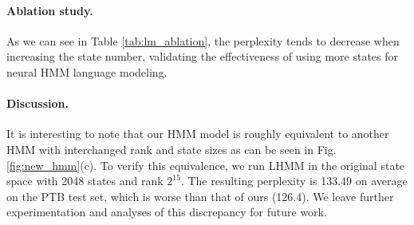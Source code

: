 \documentclass[11pt]{article}
\begin{document}
\paragraph{Ablation study.} 
As we can see in Table \ref{tab:lm_ablation}, the perplexity tends to decrease when increasing the state number, validating the effectiveness of using more states for neural HMM language modeling.

\begin{table}[tb!]
    \centering 
    \caption{Perplexity with varying numbers of states. Following \citet{chiu2021low}, we fix the rank to 2048 for faster ablation studies.}
    \label{tab:lm_ablation}
\end{table}

\paragraph{Discussion.} It is interesting to note that our HMM model is roughly equivalent to another HMM with interchanged rank and state sizes as can be seen in Fig.\ref{fig:new_hmm}(c). To verify this equivalence, we run LHMM in the original state space with 2048 states and rank $2^{15}$. The resulting perplexity is 133.49 on average on the PTB test set, which is worse than that of ours (126.4). 
We leave further experimentation and analyses of this discrepancy for future work.
\end{document}
